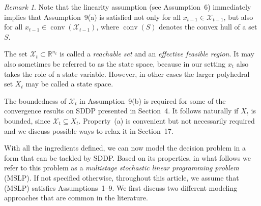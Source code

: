 \documentclass{article}
\theoremstyle{remark}
\newtheorem{remark}{Remark}
\begin{document}
\begin{remark}
Note that the linearity assumption (see Assumption~6) immediately implies that 
Assumption~9(a) is satisfied not only for all $x_{t-1} \in \mathcal{X}_{t-1}$, but also for all $x_{t-1} \in \operatorname{conv}(\mathcal{X}_{t-1})$, where $\operatorname{conv}(S)$ denotes the convex hull of a set $S$.
\end{remark}

The set $\mathcal{X}_t \subset \mathbb{R}^{n_t}$ is called a \emph{reachable set} and an \emph{effective feasible region}. It may also sometimes be referred to as the state space, because in our setting $x_t$ also takes the role of a state variable. However, in other cases the larger polyhedral set $X_t$ may be called a state space.

The boundedness of $\mathcal{X}_t$ in Assumption~9(b) is required for some of the convergence results on SDDP presented in Section~4. It follows naturally if $X_t$ is bounded, since $\mathcal{X}_t \subseteq X_t$. Property~(a) is convenient but not necessarily required and we discuss possible ways to relax it in Section~17.

With all the ingredients defined, we can now model the decision problem in a form that can be tackled by SDDP. Based on its properties, in what follows we refer to this problem as a \emph{multistage stochastic linear programming problem} (MSLP). 
If not specified otherwise, throughout this article, we assume that (MSLP) satisfies Assumptions~1--9. We first discuss two different modeling approaches that are common in the literature.
\end{document}
